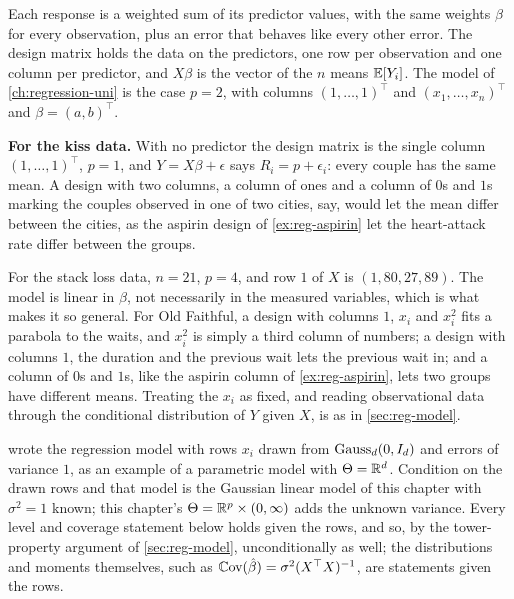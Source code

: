 \begin{inwords}
Each response is a weighted sum of its predictor values, with the same weights $\beta$ for every observation, plus an error that behaves like every other error. The design matrix holds the data on the predictors, one row per observation and one column per predictor, and $X\beta$ is the vector of the $n$ means $\operatorname*{\mathbb{E}}[Y_i]$. The model of \cref{ch:regression-uni} is the case $p = 2$, with columns $(1, \ldots, 1)^\top$ and $(x_1, \ldots, x_n)^\top$ and $\beta = (a, b)^\top$.

\textbf{For the kiss data.} With no predictor the design matrix is the single column $(1, \ldots, 1)^\top$, $p = 1$, and $Y = X\beta + \epsilon$ says $R_i = p + \epsilon_i$: every couple has the same mean. A design with two columns, a column of ones and a column of $0$s and $1$s marking the couples observed in one of two cities, say, would let the mean differ between the cities, as the aspirin design of \cref{ex:reg-aspirin} let the heart-attack rate differ between the groups.
\end{inwords}

For the stack loss data, $n = 21$, $p = 4$, and row $1$ of $X$ is $(1, 80, 27, 89)$.
The model is linear in $\beta$, not necessarily in the measured variables, which is what makes it so general.
For Old Faithful, a design with columns $1$, $x_i$ and $x_i^2$ fits a parabola to the waits, and $x_i^2$ is simply a third column of numbers; a design with columns $1$, the duration and the previous wait lets the previous wait in; and a column of $0$s and $1$s, like the aspirin column of \cref{ex:reg-aspirin}, lets two groups have different means.
Treating the $x_i$ as fixed, and reading observational data through the conditional distribution of $Y$ given $X$, is as in \cref{sec:reg-model}.

\begin{remark}
 wrote the regression model with rows $x_i$ drawn from $\text{Gauss}_d(0, I_d)$ and errors of variance $1$, as an example of a parametric model with $\Theta = \mathbb{R}^d$.
Condition on the drawn rows and that model is the Gaussian linear model of this chapter with $\sigma^2 = 1$ known; this chapter's $\Theta = \mathbb{R}^p \times (0, \infty)$ adds the unknown variance.
Every level and coverage statement below holds given the rows, and so, by the tower-property argument of \cref{sec:reg-model}, unconditionally as well; the distributions and moments themselves, such as $\operatorname*{\mathbb{C}\text{ov}}(\hat{\beta}) = \sigma^2(X^\top X)^{-1}$, are statements given the rows.
\end{remark}

